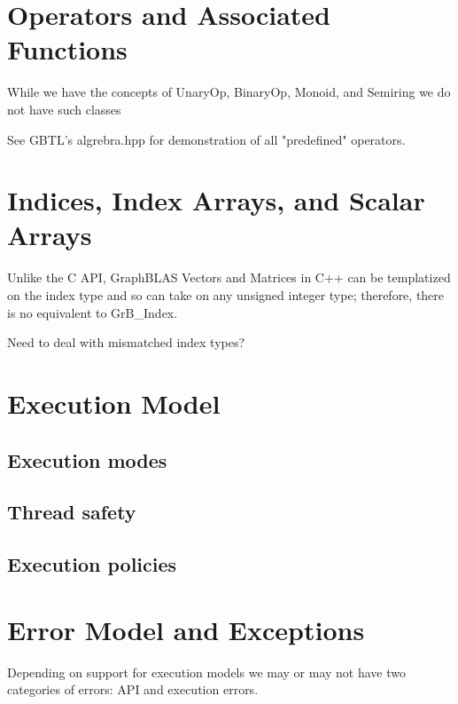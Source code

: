 \section{Operators and Associated Functions}

While we have the concepts of UnaryOp, BinaryOp, Monoid, and Semiring we do not have such classes

See GBTL's {\sf algrebra.hpp} for demonstration of all "predefined" operators.


\section{Indices, Index Arrays, and Scalar Arrays}

Unlike the C API, GraphBLAS Vectors and Matrices in C++ can be templatized on
the index type and so can take on any unsigned integer type; therefore, there is
no equivalent to GrB\_Index.

Need to deal with mismatched index types?

\section{Execution Model}

\subsection{Execution modes}

\subsection{Thread safety}

\subsection{Execution policies}


\section{Error Model and Exceptions}
\label{Sec:ErrorModel}

Depending on support for execution models we may or may not have two 
categories of errors: API and execution errors.

